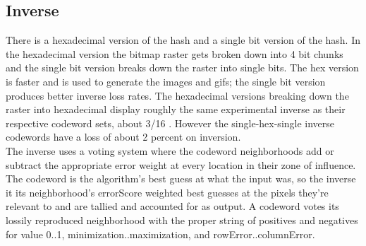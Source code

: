 \documentclass[11pt]{article}
\begin{document}
\subsection{Inverse}

There is a hexadecimal version of the hash and a single bit version of the hash. In the hexadecimal version the bitmap raster gets broken down into 4 bit chunks and the single bit version breaks down the raster into single bits. The hex version is faster and is used to generate the images and gifs; the single bit version produces better inverse loss rates. The hexadecimal versions breaking down the raster into hexadecimal display roughly the same experimental inverse as their respective codeword sets, about 3/16 . However the single-hex-single inverse codewords have a loss of about 2 percent on inversion.  \\

The inverse uses a voting system where the codeword neighborhoods add or subtract the appropriate error weight at every location in their zone of influence. The codeword is the algorithm's best guess at what the input was, so the inverse it its neighborhood's errorScore weighted best guesses at the pixels they're relevant to and are tallied and accounted for as output. A codeword votes its lossily reproduced neighborhood with the proper string of positives and negatives  for value 0..1, minimization..maximization, and rowError..columnError.\\
\end{document}
